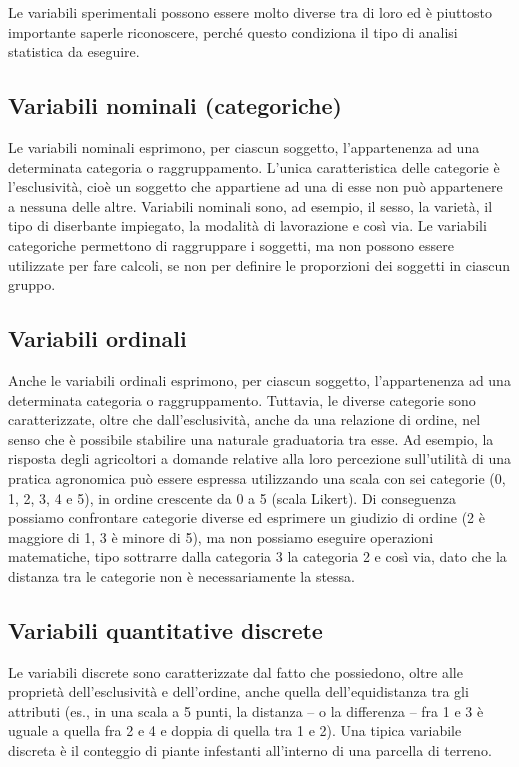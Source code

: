 \documentclass[a4paper,12pt,oneside]{book}
\theoremstyle{definition}
\theoremstyle{definition}
\theoremstyle{definition}
\theoremstyle{remark}
\begin{document}
Le variabili sperimentali possono essere molto diverse tra di loro ed è
piuttosto importante saperle riconoscere, perché questo condiziona il
tipo di analisi statistica da eseguire.

\subsection{Variabili nominali
(categoriche)}\label{variabili-nominali-categoriche}

Le variabili nominali esprimono, per ciascun soggetto, l'appartenenza ad
una determinata categoria o raggruppamento. L'unica caratteristica delle
categorie è l'esclusività, cioè un soggetto che appartiene ad una di
esse non può appartenere a nessuna delle altre. Variabili nominali sono,
ad esempio, il sesso, la varietà, il tipo di diserbante impiegato, la
modalità di lavorazione e così via. Le variabili categoriche permettono
di raggruppare i soggetti, ma non possono essere utilizzate per fare
calcoli, se non per definire le proporzioni dei soggetti in ciascun
gruppo.

\subsection{Variabili ordinali}\label{variabili-ordinali}

Anche le variabili ordinali esprimono, per ciascun soggetto,
l'appartenenza ad una determinata categoria o raggruppamento. Tuttavia,
le diverse categorie sono caratterizzate, oltre che dall'esclusività,
anche da una relazione di ordine, nel senso che è possibile stabilire
una naturale graduatoria tra esse. Ad esempio, la risposta degli
agricoltori a domande relative alla loro percezione sull'utilità di una
pratica agronomica può essere espressa utilizzando una scala con sei
categorie (0, 1, 2, 3, 4 e 5), in ordine crescente da 0 a 5 (scala
Likert). Di conseguenza possiamo confrontare categorie diverse ed
esprimere un giudizio di ordine (2 è maggiore di 1, 3 è minore di 5), ma
non possiamo eseguire operazioni matematiche, tipo sottrarre dalla
categoria 3 la categoria 2 e così via, dato che la distanza tra le
categorie non è necessariamente la stessa.

\subsection{Variabili quantitative
discrete}\label{variabili-quantitative-discrete}

Le variabili discrete sono caratterizzate dal fatto che possiedono,
oltre alle proprietà dell'esclusività e dell'ordine, anche quella
dell'equidistanza tra gli attributi (es., in una scala a 5 punti, la
distanza -- o la differenza -- fra 1 e 3 è uguale a quella fra 2 e 4 e
doppia di quella tra 1 e 2). Una tipica variabile discreta è il
conteggio di piante infestanti all'interno di una parcella di terreno.
\end{document}
